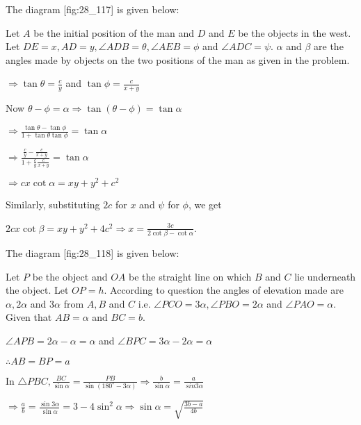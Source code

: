 \item The diagram [fig:28_117] is given below:

  \startplacefigure[reference=fig:28_117]
    \externalfigure[28_117.pdf]
  \stopplacefigure

  Let $A$ be the initial position of the man and $D$ and $E$ be the objects in the west. Let $DE = x, AD
  = y, \angle ADB=\theta, \angle AEB = \phi$ and $\angle ADC=\psi$. $\alpha$ and $\beta$ are the angles made
  by objects on the two positions of the man as given in the problem.

  $\Rightarrow \tan\theta = \frac{c}{y}$ and $\tan\phi = \frac{c}{x + y}$

  Now $\theta - \phi = \alpha \Rightarrow \tan(\theta - \phi) = \tan\alpha$

  $\Rightarrow \frac{\tan\theta - \tan\phi}{1 + \tan\theta\tan\phi} = \tan\alpha$

  $\Rightarrow \frac{\frac{c}{y} - \frac{c}{x + y}}{1 + \frac{c}{y}\frac{c}{x + y}} = \tan\alpha$

  $\Rightarrow cx\cot\alpha = xy + y^2 + c^2$

  Similarly, substituting $2c$ for $x$ and $\psi$ for $\phi$, we get

  $2cx\cot\beta = xy + y^2 + 4c^2 \Rightarrow x= \frac{3c}{2\cot\beta - \cot\alpha}$.

\item The diagram [fig:28_118] is given below:

  \startplacefigure[reference=fig:28_118]
    \externalfigure[28_118.pdf]
  \stopplacefigure

  Let $P$ be the object and $OA$ be the straight line on which $B$ and $C$ lie underneath the object.
  Let $OP = h$. According to question the angles of elevation made are $\alpha, 2\alpha$ and $3\alpha$ from
  $A, B$ and $C$ i.e. $\angle PCO = 3\alpha, \angle PBO = 2\alpha$ and $\angle PAO = \alpha$. Given that
  $AB = \alpha$ and $BC = b$.

  $\angle APB = 2\alpha - \alpha = \alpha$ and $\angle BPC = 3\alpha - 2\alpha = \alpha$

  $\therefore AB = BP = a$

  In $\triangle PBC, \frac{BC}{\sin\alpha} = \frac{PB}{\sin(180^\circ - 3\alpha)} \Rightarrow \frac{b}{\sin\alpha} =
  \frac{a}{\
    sin3\alpha}$

  $\Rightarrow \frac{a}{b} = \frac{\sin3\alpha}{\sin\alpha} = 3 - 4\sin^2\alpha \Rightarrow \sin\alpha = \sqrt{\frac{3b -
      a}{4b}}$

